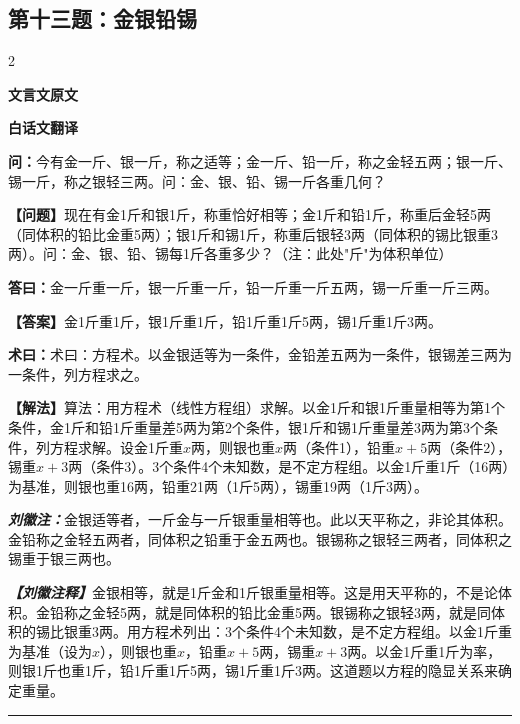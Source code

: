 \documentclass[10pt,a4paper]{article}
\newcommand{\wen}[1]{\textbf{\color{problemcolor}问：}#1\par}
\newcommand{\da}[1]{\textbf{答曰：}#1\par}
\newcommand{\shu}[1]{\textbf{术曰：}#1\par}
\newcommand{\liuhui}[1]{{\color{commentarycolor}\textit{\textbf{刘徽注：}}#1\par}}
\newcommand{\classicalheader}[1]{{\centering\large\bfseries\color{classicalcolor} #1\par\vspace{0.5em}}}
\newcommand{\wenmodern}[1]{\textbf{\color{moderncolor}【问题】}#1\par}
\newcommand{\damodern}[1]{\textbf{【答案】}#1\par}
\newcommand{\shumodern}[1]{\textbf{【解法】}#1\par}
\newcommand{\liuhuimodern}[1]{{\color{commentarycolor}\textit{\textbf{【刘徽注释】}}#1\par}}
\newcommand{\modernheader}[1]{{\centering\large\bfseries\color{moderncolor} #1\par\vspace{0.5em}}}
\newcommand{\problemsec}[1]{\subsection*{#1}}
\begin{document}
\problemsec{第十三题：金银铅锡}
\begin{paracol}{2}
\classicalheader{文言文原文}
\switchcolumn
\modernheader{白话文翻译}
\switchcolumn*

\wen{今有金一斤、银一斤，称之适等；金一斤、铅一斤，称之金轻五两；银一斤、锡一斤，称之银轻三两。问：金、银、铅、锡一斤各重几何？}

\switchcolumn

\wenmodern{现在有金1斤和银1斤，称重恰好相等；金1斤和铅1斤，称重后金轻5两（同体积的铅比金重5两）；银1斤和锡1斤，称重后银轻3两（同体积的锡比银重3两）。问：金、银、铅、锡每1斤各重多少？（注：此处"斤"为体积单位）}

\switchcolumn*

\da{金一斤重一斤，银一斤重一斤，铅一斤重一斤五两，锡一斤重一斤三两。}

\switchcolumn

\damodern{金1斤重1斤，银1斤重1斤，铅1斤重1斤5两，锡1斤重1斤3两。}

\switchcolumn*

\shu{术曰：方程术。以金银适等为一条件，金铅差五两为一条件，银锡差三两为一条件，列方程求之。}

\switchcolumn

\shumodern{算法：用方程术（线性方程组）求解。以金1斤和银1斤重量相等为第1个条件，金1斤和铅1斤重量差5两为第2个条件，银1斤和锡1斤重量差3两为第3个条件，列方程求解。设金1斤重$x$两，则银也重$x$两（条件1），铅重$x+5$两（条件2），锡重$x+3$两（条件3）。3个条件4个未知数，是不定方程组。以金1斤重1斤（16两）为基准，则银也重16两，铅重21两（1斤5两），锡重19两（1斤3两）。}

\switchcolumn*

\liuhui{金银适等者，一斤金与一斤银重量相等也。此以天平称之，非论其体积。金铅称之金轻五两者，同体积之铅重于金五两也。银锡称之银轻三两者，同体积之锡重于银三两也。}

\switchcolumn

\liuhuimodern{金银相等，就是1斤金和1斤银重量相等。这是用天平称的，不是论体积。金铅称之金轻5两，就是同体积的铅比金重5两。银锡称之银轻3两，就是同体积的锡比银重3两。用方程术列出：3个条件4个未知数，是不定方程组。以金1斤重为基准（设为$x$），则银也重$x$，铅重$x+5$两，锡重$x+3$两。以金1斤重1斤为率，则银1斤也重1斤，铅1斤重1斤5两，锡1斤重1斤3两。这道题以方程的隐显关系来确定重量。}

\end{paracol}

\vspace{0.3cm}
\hrule
\vspace{0.3cm}
\end{document}

